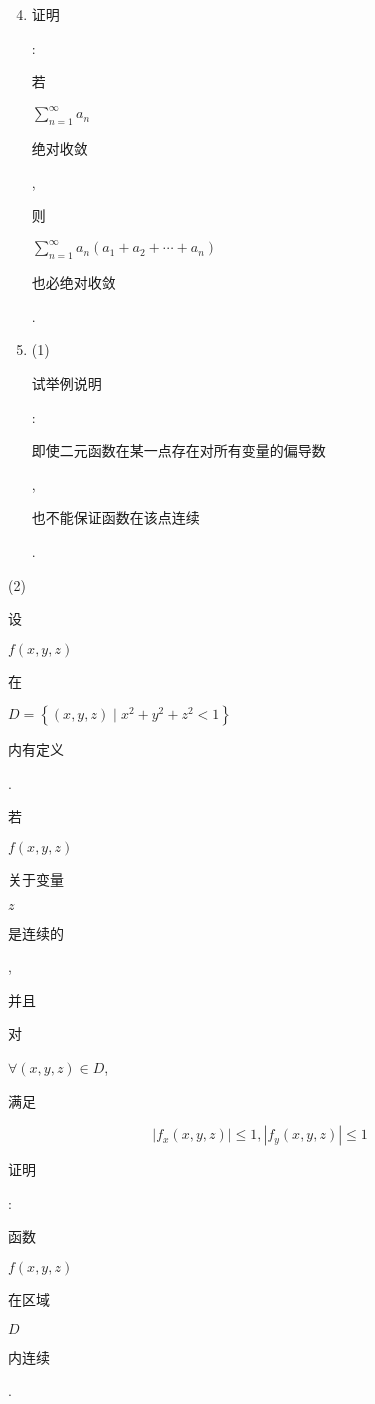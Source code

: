 \documentclass[10pt]{article}
\begin{document}
\begin{enumerate}
  \setcounter{enumi}{3}
  \item \begin{CJK}{UTF8}{mj}证明\end{CJK}: \begin{CJK}{UTF8}{mj}若\end{CJK} $\sum_{n=1}^{\infty} a_{n}$ \begin{CJK}{UTF8}{mj}绝对收敛\end{CJK}, \begin{CJK}{UTF8}{mj}则\end{CJK} $\sum_{n=1}^{\infty} a_{n}\left(a_{1}+a_{2}+\cdots+a_{n}\right)$ \begin{CJK}{UTF8}{mj}也必绝对收敛\end{CJK}.

  \item (1) \begin{CJK}{UTF8}{mj}试举例说明\end{CJK}: \begin{CJK}{UTF8}{mj}即使二元函数在某一点存在对所有变量的偏导数\end{CJK}, \begin{CJK}{UTF8}{mj}也不能保证函数在该点连续\end{CJK}.

\end{enumerate}
(2) \begin{CJK}{UTF8}{mj}设\end{CJK} $f(x, y, z)$ \begin{CJK}{UTF8}{mj}在\end{CJK} $D=\left\{(x, y, z) \mid x^{2}+y^{2}+z^{2}<1\right\}$ \begin{CJK}{UTF8}{mj}内有定义\end{CJK}. \begin{CJK}{UTF8}{mj}若\end{CJK} $f(x, y, z)$ \begin{CJK}{UTF8}{mj}关于变量\end{CJK} $z$ \begin{CJK}{UTF8}{mj}是连续的\end{CJK}, \begin{CJK}{UTF8}{mj}并且\end{CJK} \begin{CJK}{UTF8}{mj}对\end{CJK} $\forall(x, y, z) \in D$, \begin{CJK}{UTF8}{mj}满足\end{CJK}
$$
\left|f_{x}(x, y, z)\right| \leqslant 1,\left|f_{y}(x, y, z)\right| \leqslant 1
$$
\begin{CJK}{UTF8}{mj}证明\end{CJK}: \begin{CJK}{UTF8}{mj}函数\end{CJK} $f(x, y, z)$ \begin{CJK}{UTF8}{mj}在区域\end{CJK} $D$ \begin{CJK}{UTF8}{mj}内连续\end{CJK}.
\end{document}
